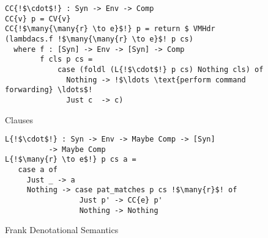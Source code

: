 \begin{figure}[float]
\begin{lstlisting}
CC{!$\cdot$!} : Syn -> Env -> Comp
CC{v} p = CV{v}
CC{!$\many{\many{r} \to e}$!} p = return $ VMHdr (lambdacs.f !$\many{\many{r} \to e}$! p cs)
  where f : [Syn] -> Env -> [Syn] -> Comp
        f cls p cs =
            case (foldl (L{!$\cdot$!} p cs) Nothing cls) of
              Nothing -> !$\ldots \text{perform command forwarding} \ldots$!
              Just c  -> c)
\end{lstlisting}
Clauses
\begin{lstlisting}
L{!$\cdot$!} : Syn -> Env -> Maybe Comp -> [Syn]
          -> Maybe Comp
L{!$\many{r} \to e$!} p cs a =
   case a of
     Just _ -> a
     Nothing -> case pat_matches p cs !$\many{r}$! of
                 Just p' -> CC{e} p'
                 Nothing -> Nothing
\end{lstlisting}
\caption{Frank Denotational Semantics}
\label{fig:frank-deno-sem}
\end{figure}

